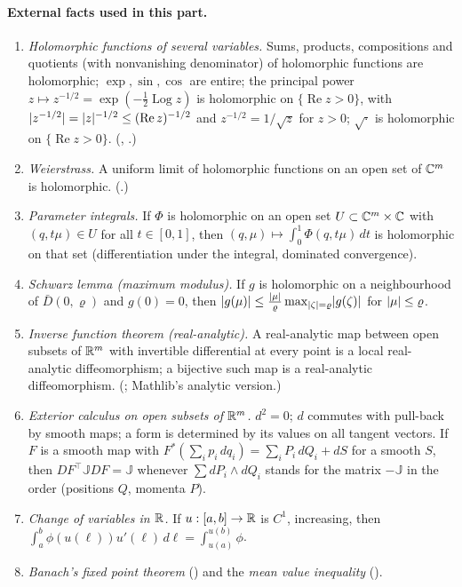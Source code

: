 \paragraph{External facts used in this part.}
{\raggedright
\begin{enumerate}[label=(X\arabic*),ref=(X\arabic*)]
\item\label{bpI:p7:x-hol} \emph{Holomorphic functions of several variables.} Sums, products, compositions and quotients (with nonvanishing denominator) of holomorphic functions are holomorphic;
  $\exp,\sin,\cos$ are entire; the principal power $z\mapsto z^{-1/2}=\exp(-\tfrac12\operatorname{Log}z)$ is holomorphic on $\{\operatorname{Re}z>0\}$, with $\lvert z^{-1/2}\rvert=\lvert z\rvert^{-1/2}\le(\operatorname{Re}z)^{-1/2}$ and $z^{-1/2}=1/\sqrt z$ for $z>0$; $\sqrt{\cdot}$ is holomorphic on $\{\operatorname{Re}z>0\}$.
  (, .)
\item\label{bpI:p7:x-weier} \emph{Weierstrass.} A uniform limit of holomorphic functions on an open set of $\mathbb{C}^m$ is holomorphic. (.)
\item\label{bpI:p7:x-param} \emph{Parameter integrals.} If $\Phi$ is holomorphic on an open set $U\subset\mathbb{C}^m\times\mathbb{C}$ with $(q,t\mu)\in U$ for all $t\in[0,1]$, then $(q,\mu)\mapsto\int_0^1\Phi(q,t\mu)\,dt$ is holomorphic on that set (differentiation under the integral, dominated convergence).
\item\label{bpI:p7:x-schwarz} \emph{Schwarz lemma (maximum modulus).} If $g$ is holomorphic on a neighbourhood of $\bar D(0,\varrho)$ and $g(0)=0$, then $\lvert g(\mu)\rvert\le\frac{\lvert \mu\rvert}{\varrho}\max_{\lvert \zeta\rvert=\varrho}\lvert g(\zeta)\rvert$ for $\lvert \mu\rvert\le\varrho$.
\item\label{bpI:p7:x-ift} \emph{Inverse function theorem (real-analytic).} A real-analytic map between open subsets of $\mathbb{R}^m$ with invertible differential at every point is a local real-analytic diffeomorphism; a bijective such map is a real-analytic diffeomorphism. (; Mathlib's analytic version.)
\item\label{bpI:p7:x-forms} \emph{Exterior calculus on open subsets of $\mathbb{R}^m$.} $d^2=0$; $d$ commutes with pull-back by smooth maps; a form is determined by its values on all tangent vectors.
  If $F$ is a smooth map with $F^*(\sum_ip_i\,dq_i)=\sum_i P_i\,dQ_i+dS$ for a smooth $S$, then $DF^{\top}\mathbb JDF=\mathbb J$ whenever $\sum dP_i\wedge dQ_i$ stands for the matrix $-\mathbb J$ in the order (positions $Q$, momenta $P$).
\item\label{bpI:p7:x-change} \emph{Change of variables in $\mathbb{R}$.} If $u:[a,b]\to\mathbb{R}$ is $C^1$, increasing, then $\int_a^b\phi(u(\ell))u'(\ell)\,d\ell=\int_{u(a)}^{u(b)}\phi$.
\item\label{bpI:p7:x-banach} \emph{Banach's fixed point theorem} () and the \emph{mean value inequality} ().
\end{enumerate}\par}

